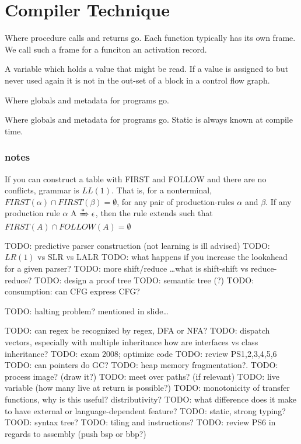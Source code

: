 \section{Compiler Technique}
\begin{definition}[LL]\label{def:LL}
\end{definition}

\begin{definition}\label{def:staticmemory}
    Where procedure calls and returns go. Each function typically has
    its own frame. We call such a frame for a funciton an activation record.
\end{definition}

\begin{definition}\label{def:livevariable}
    A variable which holds a value that might be read. If a value is assigned
    to but never used again it is not in the out-set of a block in a control
    flow graph.
\end{definition}

\begin{definition}\label{def:staticmemory}
    Where globals and metadata for programs go.
\end{definition}

\begin{definition}\label{def:staticmemory}
    Where globals and metadata for programs go. Static is always known at
    compile time.
\end{definition}

\subsubsection{notes}
If you can construct a table with FIRST and FOLLOW and there are no
conflicts, grammar is $LL(1)$. That is, for a nonterminal, $FIRST(\alpha) \cap FIRST(\beta) = \emptyset$, for any pair of production-rules $\alpha$ and $\beta$. If any production rule $\alpha$ A $\xRightarrow{*} \epsilon$, then the rule extends such that $FIRST(A) \cap FOLLOW(A) = \emptyset$
\usepackage{mathtools}
TODO: predictive parser construction (not learning is ill advised)
TODO: $LR(1)$ vs SLR vs LALR
TODO: what happens if you increase the lookahead for a given parser?
TODO: more shift/reduce \dots what is shift-shift vs reduce-reduce?
TODO: design a proof tree
TODO: semantic tree (?)
TODO: consumption: can CFG express CFG? 

TODO: halting problem? mentioned in slide\dots

TODO: can regex be recognized by regex, DFA or NFA?
TODO: dispatch vectors, especially with multiple inheritance
    how are interfaces vs class inheritance?
TODO: exam 2008; optimize code
TODO: review PS{1,2,3,4,5,6}
TODO: can pointers do GC?
TODO: heap memory fragmentation?.
TODO: process image? (draw it?)
TODO: meet over paths? (if relevant)
TODO: live variable (how many live at return is possible?)
TODO: monotonicity of transfer functions, why is this useful?
    distributivity?
TODO: what difference does it make to have external or language-dependent feature?
TODO: static, strong typing?
TOOD: syntax tree?
TODO: tiling and instructions?
TODO: review PS6 in regards to assembly (push bsp or bbp?)
